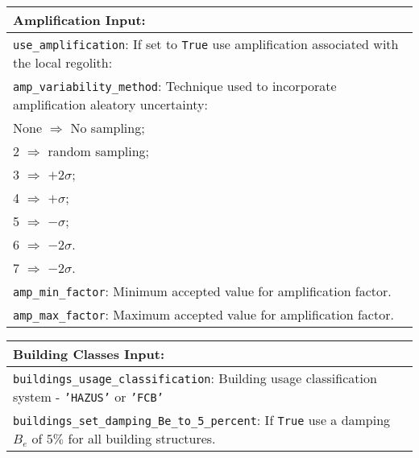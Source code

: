 \documentclass[a4paper, 12pt]{report}
\begin{document}
\vspace{2em}
\begin{tabular}{|p{\textwidth}|}
\hline
\vspace{0.3em} \noindent \Large \textbf{Amplification Input:} \normalsize \\
\hline
\vspace{0.1em} \texttt{use\_amplification}: 
If set to \texttt{True} use amplification associated with the local regolith: \\
\hline
\vspace{0.1em} \texttt{amp\_variability\_method}: 
Technique used to incorporate amplification aleatory uncertainty: \\
 \hspace{0.5em} None $\Rightarrow$ No sampling; \\
 \hspace{0.5em} 2 $\Rightarrow$ random sampling; \\
 \hspace{0.5em} 3 $\Rightarrow$ $+2\sigma$; \\
 \hspace{0.5em} 4 $\Rightarrow$ $+\sigma$; \\
 \hspace{0.5em} 5 $\Rightarrow$ $-\sigma$; \\
 \hspace{0.5em} 6 $\Rightarrow$ $-2\sigma$.\\
 \hspace{0.5em} 7 $\Rightarrow$ $-2\sigma$.\\
\hline
\vspace{0.1em} \texttt{amp\_min\_factor}: 
Minimum accepted value for amplification factor.    \\
\hline
\vspace{0.1em} \texttt{amp\_max\_factor}:
Maximum accepted value for amplification factor.   \\
\hline
\end{tabular}

\vspace{2em}
\begin{tabular}{|p{\textwidth}|}
\hline
\vspace{0.3em} \noindent \Large \textbf{Building Classes Input:} \normalsize \\
\hline
\vspace{0.1em} \texttt{buildings\_usage\_classification}: 
Building usage classification system - \texttt{'HAZUS'} or \texttt{'FCB'} \\
\hline
\vspace{0.1em} \texttt{buildings\_set\_damping\_Be\_to\_5\_percent}: 
If \texttt{True} use a damping $B_e$ of $5\%$ for all building structures.\\
\hline
 \end{tabular}
\end{document}
